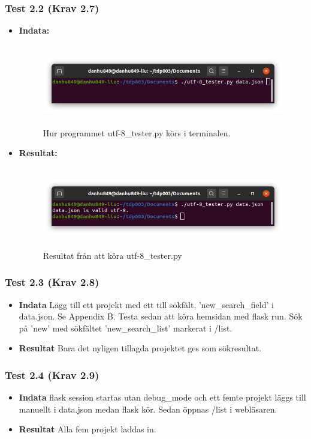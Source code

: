 \documentclass{TDP003mall}
\begin{document}
\subsubsection*{Test 2.2 (Krav 2.7)}
\begin{itemize}
\item[]\textbf{Indata:}
\begin{figure}[h!]
\centerline{\includegraphics[width=\textwidth, height=3.5cm]{../Pictures/utf-8_tester_test.png}}
\caption{Hur programmet utf-8\_tester.py körs i terminalen.\label{fig:}}
\end{figure}
\item[]\textbf{Resultat:}
\begin{figure}[h!]
\centerline{\includegraphics[width=\textwidth, height=3.5cm]{../Pictures/utf-8_tester_valid.png}}
\caption{Resultat från att köra utf-8\_tester.py\label{fig:}}
\end{figure}
\end{itemize}
\subsubsection*{Test 2.3 (Krav 2.8)}
\begin{itemize}%
\item[]\textbf{Indata} Lägg till ett projekt med ett till sökfält, 'new\_search\_field' i data.json. Se Appendix B. Testa sedan att köra hemsidan med flask run. Sök på 'new' med sökfältet 'new\_search\_list' markerat i /list.
\item[]\textbf{Resultat} Bara det nyligen tillagda projektet ges som sökresultat.
\end{itemize}
\subsubsection*{Test 2.4 (Krav 2.9)}
\begin{itemize}
\item[]\textbf{Indata} flask session startas utan debug\_mode och ett femte projekt läggs till manuellt i data.json medan flask kör. Sedan öppnas /list i webläsaren.
\item[]\textbf{Resultat} Alla fem projekt laddas in.
\end{itemize}
\end{document}
